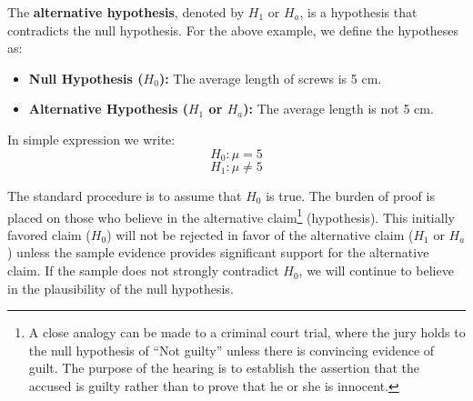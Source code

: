 \documentclass[twoside]{book}
\begin{document}
The \textbf{alternative hypothesis}, denoted by $H_1$ or $H_a$, is a hypothesis that contradicts the null hypothesis. For the above example, we define the hypotheses as:

\begin{itemize}
    \item \textbf{Null Hypothesis ($H_0$):} The average length of screws is 5 cm.
    \item \textbf{Alternative Hypothesis ($H_1$ or $H_a$):} The average length is not 5 cm.
\end{itemize}

In simple expression we write:
    $$H_0: \mu = 5$$
    $$H_1 : \mu \neq 5$$


The standard procedure is to assume that $H_0$ is true. The burden of proof is placed on those who believe in the alternative claim\footnote{A close analogy can be made to a criminal court trial, where the jury holds to the null hypothesis of ``Not guilty'' unless there is convincing evidence of guilt.  The purpose of the hearing is to establish the assertion that the accused is guilty rather than to prove that he or she is innocent.} (hypothesis). This initially favored claim ($H_0$) will not be rejected in favor of the alternative claim ($H_1$ or $H_a$) unless the sample evidence provides significant support for the alternative claim. If the sample does not strongly contradict $H_0$, we will continue to believe in the plausibility of the null hypothesis.

\vspace{3mm}
\begin{center}
\end{center}
\end{document}
